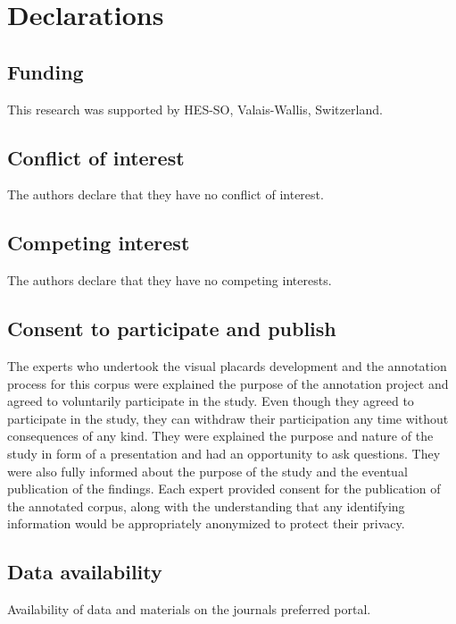 \documentclass[sn-mathphys,Numbered]{sn-jnl}%
\theoremstyle{thmstyleone}%
\theoremstyle{thmstyletwo}%
\theoremstyle{thmstylethree}%
\begin{document}
\section*{Declarations}
%
\subsection*{Funding}
%
This research was supported by HES-SO, Valais-Wallis, Switzerland. 
%
%
%
\subsection*{Conflict of interest}
%
The authors declare that they have no conflict of interest.
%
%
%
\subsection*{Competing interest}
%
The authors declare that they have no competing interests.
%
%
%
%
%
%
%
\subsection*{Consent to participate and publish}
%
The experts who undertook the visual placards development and the annotation process for this corpus were explained the purpose of the annotation project and agreed to voluntarily participate in the study.
Even though they agreed to participate in the study, they can withdraw their participation any time without consequences of any kind.
They were explained the purpose and nature of the study in form of a presentation and had an opportunity to ask questions.
They were also fully informed about the purpose of the study and the eventual publication of the findings.
Each expert provided consent for the publication of the annotated corpus, along with the understanding that any identifying information would be appropriately anonymized to protect their privacy. 
%
%
%
\subsection*{Data availability}
%
Availability of data and materials on the journals preferred portal.
%
%
%
\end{document}
